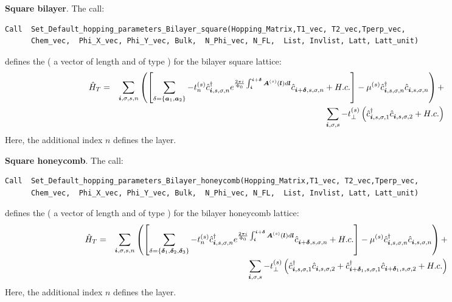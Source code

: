 \noindent
\textbf{Square bilayer}.     The call:
 \begin{lstlisting}[style=fortran]
Call  Set_Default_hopping_parameters_Bilayer_square(Hopping_Matrix,T1_vec, T2_vec,Tperp_vec, 
      Chem_vec,  Phi_X_vec, Phi_Y_vec, Bulk,  N_Phi_vec, N_FL,  List, Invlist, Latt, Latt_unit)
\end{lstlisting}  
defines  the   (  a vector of length   and of type  )    for the  bilayer  square  lattice:                 
\begin{eqnarray}
\hat{H}_T  =  & &   \sum_{\boldsymbol{i}, \sigma, s,n } \left(    \left[  \sum_{ \delta = \left\{ \boldsymbol{a}_1, \boldsymbol{a}_2\right\} }  - t_n^{(s)} \hat{c}^{\dagger}_{\boldsymbol{i},s,\sigma,n}   e^{\frac{2 \pi i}{\Phi_0} \int_{\boldsymbol{i}}^{\boldsymbol{i}+ \boldsymbol{\delta}}  \boldsymbol{A}^{(s)}(\boldsymbol{l})  d \boldsymbol{l}}   \hat{c}^{}_{\boldsymbol{i} + \boldsymbol{\delta},s,\sigma,n} +  H.c. \right]       -  \mu^{(s)} \hat{c}^{\dagger}_{\boldsymbol{i},s,\sigma,n} \hat{c}^{}_{\boldsymbol{i},s,\sigma,n}  \right)  +  \nonumber \\
      & &    \sum_{\boldsymbol{i}, \sigma, s } -  t_{\perp}^{(s)}  \left( \hat{c}^{\dagger}_{\boldsymbol{i},s,\sigma,1} \hat{c}^{}_{\boldsymbol{i},s,\sigma,2}    + H.c.  \right) 
\end{eqnarray}
Here, the additional  index  $n$  defines the   layer.  

\noindent
\textbf{Square honeycomb}.     The call:
 \begin{lstlisting}[style=fortran]
Call  Set_Default_hopping_parameters_Bilayer_honeycomb(Hopping_Matrix,T1_vec, T2_vec,Tperp_vec, 
      Chem_vec,  Phi_X_vec, Phi_Y_vec, Bulk,  N_Phi_vec, N_FL,  List, Invlist, Latt, Latt_unit)
\end{lstlisting}  
defines  the   (  a vector of length   and of type  )    for the  bilayer   honeycomb  lattice:                 
\begin{eqnarray}
\hat{H}_T  =  & &   \sum_{\boldsymbol{i}, \sigma, s,n } \left(    \left[  \sum_{ \delta = \left\{ \boldsymbol{\delta}_1, \boldsymbol{\delta}_2, \boldsymbol{\delta}_3 \right\} }  - t_n^{(s)} \hat{c}^{\dagger}_{\boldsymbol{i},s,\sigma,n}   e^{\frac{2 \pi i}{\Phi_0} \int_{\boldsymbol{i}}^{\boldsymbol{i}+ \boldsymbol{\delta}}  \boldsymbol{A}^{(s)}(\boldsymbol{l})  d \boldsymbol{l}}   \hat{c}^{}_{\boldsymbol{i} + \boldsymbol{\delta},s,\sigma,n} +  H.c. \right]       -  \mu^{(s)} \hat{c}^{\dagger}_{\boldsymbol{i},s,\sigma,n} \hat{c}^{}_{\boldsymbol{i},s,\sigma,n}  \right)  +  \nonumber \\
      & &    \sum_{\boldsymbol{i}, \sigma, s } -  t_{\perp}^{(s)}  \left( \hat{c}^{\dagger}_{\boldsymbol{i},s,\sigma,1} \hat{c}^{}_{\boldsymbol{i},s,\sigma,2}   +
                   \hat{c}^{\dagger}_{\boldsymbol{i} + \boldsymbol{\delta}_1,s,\sigma,1} \hat{c}^{}_{\boldsymbol{i} + \boldsymbol{\delta}_1,s,\sigma,2}  + H.c.  \right) 
\end{eqnarray}
Here, the additional  index  $n$  defines the   layer.  



